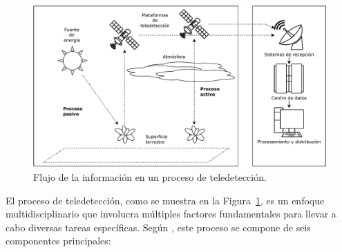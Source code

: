 \begin{figure}[H]
    \begin{center}
        \includegraphics[width=1\textwidth]{Images/Teledeteccion.pdf}
    \end{center}
    \caption{Flujo de la información en un proceso de teledetección.}
    \label{fig:Teledeteccion}
\end{figure}

El proceso de teledetección, como se muestra en la Figura~\ref{fig:Teledeteccion}, es un enfoque multidisciplinario que involucra múltiples factores fundamentales para llevar a cabo diversas tareas específicas. Según , este proceso se compone de seis componentes principales:


